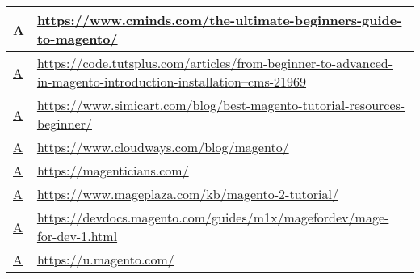 \begin{table}[ht!]
{\begin{tabular}{|l|p{20cm}|}
  \href{https://web.archive.org/web/20181114201450/https://www.cminds.com/the-ultimate-beginners-guide-to-magento/}{A}                                              & \href{https://www.cminds.com/the-ultimate-beginners-guide-to-magento/}{https://www.cminds.com/the-ultimate-beginners-guide-to-magento/} \\ \hline
  \href{https://web.archive.org/web/20181113030038/https://code.tutsplus.com/articles/from-beginner-to-advanced-in-magento-introduction-installation--cms-21969}{A} & \href{https://code.tutsplus.com/articles/from-beginner-to-advanced-in-magento-introduction-installation--cms-21969}{https://code.tutsplus.com/articles/from-beginner-to-advanced-in-magento-introduction-installation--cms-21969} \\ \hline
  \href{https://web.archive.org/web/20181113030108/https://www.simicart.com/blog/best-magento-tutorial-resources-beginner/}{A}                                      & \href{https://www.simicart.com/blog/best-magento-tutorial-resources-beginner/}{https://www.simicart.com/blog/best-magento-tutorial-resources-beginner/} \\ \hline
  \href{https://web.archive.org/web/20181113030148/https://www.cloudways.com/blog/magento/}{A}                                                                      & \href{https://www.cloudways.com/blog/magento/}{https://www.cloudways.com/blog/magento/} \\ \hline
  \href{https://web.archive.org/web/20181113030232/https://magenticians.com/}{A}                                                                                    & \href{https://magenticians.com/}{https://magenticians.com/} \\ \hline
  \href{https://web.archive.org/web/20181113030303/https://www.mageplaza.com/kb/magento-2-tutorial/}{A}                                                             & \href{https://www.mageplaza.com/kb/magento-2-tutorial/}{https://www.mageplaza.com/kb/magento-2-tutorial/} \\ \hline
  \href{https://web.archive.org/web/20181113030342/https://devdocs.magento.com/guides/m1x/magefordev/mage-for-dev-1.html}{A}                                        & \href{https://devdocs.magento.com/guides/m1x/magefordev/mage-for-dev-1.html}{https://devdocs.magento.com/guides/m1x/magefordev/mage-for-dev-1.html} \\ \hline
  \href{https://web.archive.org/web/20181113030401/https://u.magento.com/}{A}                                                                                       & \href{https://u.magento.com/}{https://u.magento.com/} \\ \hline

\end{tabular}}
\end{table}
